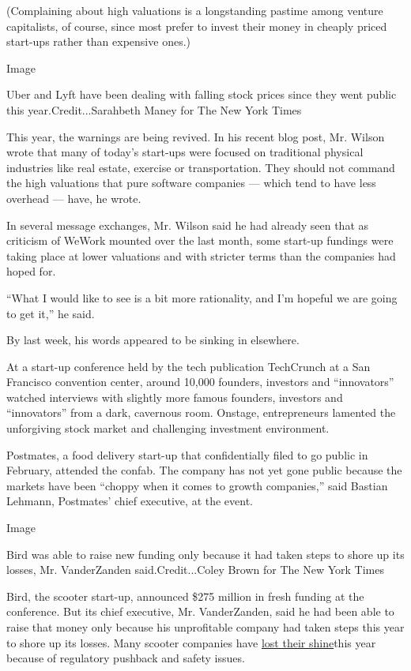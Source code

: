 (Complaining about high valuations is a longstanding pastime among
venture capitalists, of course, since most prefer to invest their money
in cheaply priced start-ups rather than expensive ones.)

Image

Uber and Lyft have been dealing with falling stock prices since they
went public this year.Credit...Sarahbeth Maney for The New York Times

This year, the warnings are being revived. In his recent blog post, Mr.
Wilson wrote that many of today's start-ups were focused on traditional
physical industries like real estate, exercise or transportation. They
should not command the high valuations that pure software companies ---
which tend to have less overhead --- have, he wrote.

In several message exchanges, Mr. Wilson said he had already seen that
as criticism of WeWork mounted over the last month, some start-up
fundings were taking place at lower valuations and with stricter terms
than the companies had hoped for.

``What I would like to see is a bit more rationality, and I'm hopeful we
are going to get it,'' he said.

By last week, his words appeared to be sinking in elsewhere.

At a start-up conference held by the tech publication TechCrunch at a
San Francisco convention center, around 10,000 founders, investors and
``innovators'' watched interviews with slightly more famous founders,
investors and ``innovators'' from a dark, cavernous room. Onstage,
entrepreneurs lamented the unforgiving stock market and challenging
investment environment.

Postmates, a food delivery start-up that confidentially filed to go
public in February, attended the confab. The company has not yet gone
public because the markets have been ``choppy when it comes to growth
companies,'' said Bastian Lehmann, Postmates' chief executive, at the
event.

Image

Bird was able to raise new funding only because it had taken steps to
shore up its losses, Mr. VanderZanden said.Credit...Coley Brown for The
New York Times

Bird, the scooter start-up, announced \$275 million in fresh funding at
the conference. But its chief executive, Mr. VanderZanden, said he had
been able to raise that money only because his unprofitable company had
taken steps this year to shore up its losses. Many scooter companies
have
\href{https://www.nytimes3xbfgragh.onion/2019/09/04/technology/san-diego-electric-scooters.html}{lost
their shine}this year because of regulatory pushback and safety issues.

